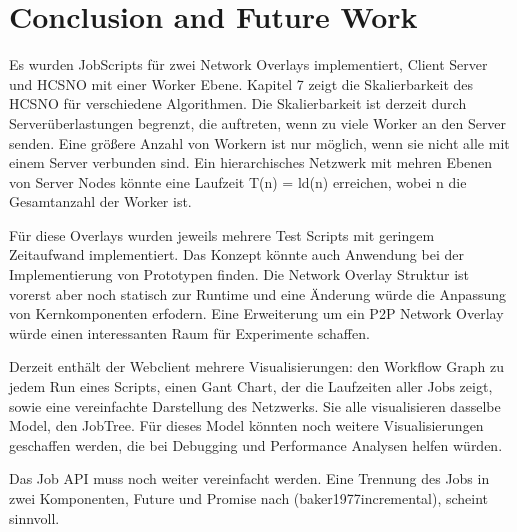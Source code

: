 \section{Conclusion and Future Work}
Es wurden JobScripts für zwei Network Overlays implementiert, Client Server und HCSNO mit einer Worker Ebene. Kapitel 7 zeigt die Skalierbarkeit des HCSNO für verschiedene Algorithmen. Die Skalierbarkeit ist derzeit durch Serverüberlastungen begrenzt, die auftreten, wenn zu viele Worker an den Server senden. Eine größere Anzahl von Workern ist nur möglich, wenn sie nicht alle mit einem Server verbunden sind. Ein hierarchisches Netzwerk mit mehren Ebenen von Server Nodes könnte eine Laufzeit  T(n) = ld(n) erreichen, wobei n die Gesamtanzahl der Worker ist.

Für diese Overlays wurden jeweils mehrere Test Scripts mit geringem Zeitaufwand  implementiert. Das Konzept könnte auch Anwendung bei der Implementierung von Prototypen finden. Die Network Overlay Struktur ist vorerst aber noch statisch zur Runtime und eine Änderung würde die Anpassung von Kernkomponenten erfodern. Eine Erweiterung um ein P2P Network Overlay würde einen interessanten Raum für Experimente schaffen.

Derzeit enthält der Webclient mehrere Visualisierungen: den Workflow Graph zu jedem Run eines Scripts, einen Gant Chart, der die Laufzeiten aller Jobs zeigt, sowie eine vereinfachte Darstellung des Netzwerks. Sie alle visualisieren dasselbe Model, den JobTree. Für dieses Model könnten noch weitere Visualisierungen geschaffen werden, die bei Debugging und Performance Analysen helfen würden.

Das Job API muss noch weiter vereinfacht werden. Eine Trennung des Jobs in zwei Komponenten, Future und Promise nach (baker1977incremental), scheint sinnvoll.
